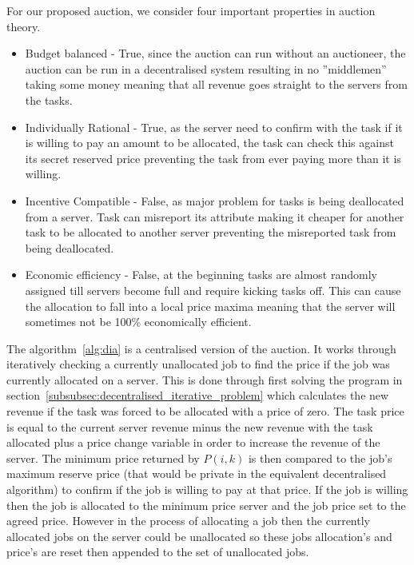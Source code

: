 For our proposed auction, we consider four important properties in auction theory. 
\begin{itemize}
    \item Budget balanced - True, since the auction can run without an auctioneer, the auction can be run in a
        decentralised system resulting in no ''middlemen'' taking some money meaning that all revenue goes straight to
        the servers from the tasks.
    \item Individually Rational - True, as the server need to confirm with the task if it is willing to pay an amount
        to be allocated, the task can check this against its secret reserved price preventing the task from ever paying
        more than it is willing.
    \item Incentive Compatible - False, as major problem for tasks is being deallocated from a server. Task can
        misreport its attribute making it cheaper for another task to be allocated to another server preventing the
        misreported task from being deallocated.
    \item Economic efficiency - False, at the beginning tasks are almost randomly assigned till servers become full and
        require kicking tasks off. This can cause the allocation to fall into a local price maxima meaning that the
        server will sometimes not be 100\% economically efficient.
\end{itemize}

The algorithm~\ref{alg:dia} is a centralised version of the auction. It works through iteratively checking a currently
unallocated job to find the price if the job was currently allocated on a server. This is done through first solving
the program in section~\ref{subsubsec:decentralised_iterative_problem} which calculates the new revenue if the task was
forced to be allocated with a price of zero. The task price is equal to the current server revenue minus the new
revenue with the task allocated plus a price change variable in order to increase the revenue of the server. The
minimum price returned by $P(i, k)$ is then compared to the job's maximum reserve price (that would be private in the
equivalent decentralised algorithm) to confirm if the job is willing to pay at that price. If the job is willing then
the job is allocated to the minimum price server and the job price set to the agreed price. However in the process of
allocating a job then the currently allocated jobs on the server could be unallocated so these jobs allocation's and
price's are reset then appended to the set of unallocated jobs.

